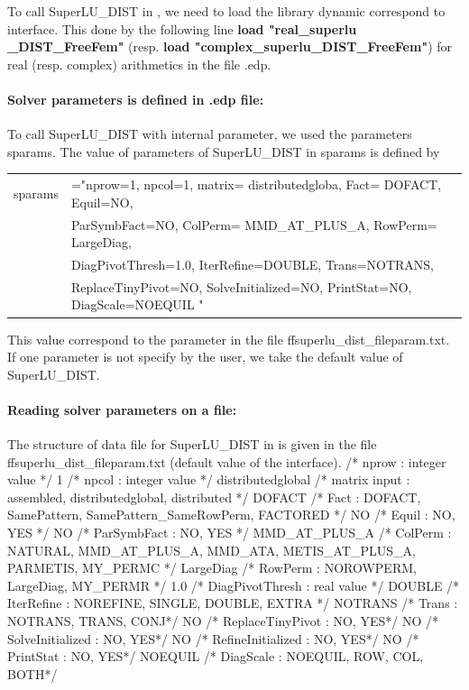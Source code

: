 \documentclass[a4paper,twoside,12pt]{book}
\begin{document}
To call SuperLU\_DIST in \freefempp, we need to load the library dynamic correspond to interface.
This done by the following line  {\bf{load "real\_superlu \_DIST\_FreeFem"}} (resp.  {\bf{load "complex\_superlu\_DIST\_FreeFem"}}) for real (resp. complex) arithmetics in the file .edp.

\vspace*{0.5cm}

\paragraph{Solver parameters is defined in .edp file:}
To call SuperLU\_DIST with internal parameter, we used the parameters sparams. The value of parameters of SuperLU\_DIST in sparams is defined by\\
\begin{tabular}{ll}
sparams&="nprow=1, npcol=1, matrix= distributedgloba, Fact= DOFACT, Equil=NO, \\
	      & ParSymbFact=NO, ColPerm= MMD\_AT\_PLUS\_A, RowPerm= LargeDiag, \\
	      & DiagPivotThresh=1.0, IterRefine=DOUBLE, Trans=NOTRANS, \\
	      & ReplaceTinyPivot=NO, SolveInitialized=NO, PrintStat=NO, DiagScale=NOEQUIL "
\end{tabular}	
This value correspond to the parameter in the file ffsuperlu\_dist\_fileparam.txt. If one parameter is not specify by the user, we take the default value of SuperLU\_DIST.

\vspace*{0.5cm}
\paragraph{Reading solver parameters on a file:}
The structure of data file for SuperLU\_DIST  in \freefempp is given in the file
ffsuperlu\_dist\_fileparam.txt  (default value of the \freefempp interface).
                               /* nprow : integer value     */
1                               /* npcol : integer value     */
distributedglobal       /* matrix input : assembled, distributedglobal, distributed */
DOFACT                  /* Fact  : DOFACT, SamePattern, SamePattern_SameRowPerm, FACTORED */
NO                           /* Equil : NO, YES */
NO                           /* ParSymbFact : NO, YES */
MMD_AT_PLUS_A  /* ColPerm : NATURAL, MMD_AT_PLUS_A, MMD_ATA, METIS_AT_PLUS_A, PARMETIS, MY_PERMC */
LargeDiag                /* RowPerm : NOROWPERM, LargeDiag, MY_PERMR */
1.0                           /* DiagPivotThresh : real value */
DOUBLE                  /* IterRefine : NOREFINE, SINGLE, DOUBLE, EXTRA */
NOTRANS               /* Trans      : NOTRANS, TRANS, CONJ*/
NO                           /* ReplaceTinyPivot  : NO, YES*/
NO                           /* SolveInitialized  : NO, YES*/
NO                           /* RefineInitialized : NO, YES*/
NO                           /* PrintStat : NO, YES*/
NOEQUIL                 /* DiagScale : NOEQUIL, ROW, COL, BOTH*/
\eFF
\end{document}

